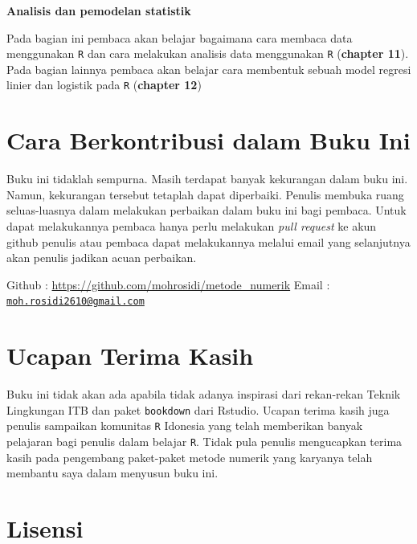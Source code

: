 \documentclass[
]{book}
\theoremstyle{definition}
\theoremstyle{definition}
\theoremstyle{definition}
\theoremstyle{definition}
\theoremstyle{remark}
\begin{document}
\textbf{Analisis dan pemodelan statistik}

Pada bagian ini pembaca akan belajar bagaimana cara membaca data menggunakan \texttt{R} dan cara melakukan analisis data menggunakan \texttt{R} (\textbf{chapter 11}). Pada bagian lainnya pembaca akan belajar cara membentuk sebuah model regresi linier dan logistik pada \texttt{R} (\textbf{chapter 12})

\hypertarget{cara-berkontribusi-dalam-buku-ini}{%
\section*{Cara Berkontribusi dalam Buku Ini}\label{cara-berkontribusi-dalam-buku-ini}}

Buku ini tidaklah sempurna. Masih terdapat banyak kekurangan dalam buku ini. Namun, kekurangan tersebut tetaplah dapat diperbaiki. Penulis membuka ruang seluas-luasnya dalam melakukan perbaikan dalam buku ini bagi pembaca. Untuk dapat melakukannya pembaca hanya perlu melakukan \emph{pull request} ke akun github penulis atau pembaca dapat melakukannya melalui email yang selanjutnya akan penulis jadikan acuan perbaikan.

Github : \url{https://github.com/mohrosidi/metode_numerik}
Email : \href{mailto:moh.rosidi2610@gmail.com}{\nolinkurl{moh.rosidi2610@gmail.com}}

\hypertarget{ucapan-terima-kasih}{%
\section*{Ucapan Terima Kasih}\label{ucapan-terima-kasih}}

Buku ini tidak akan ada apabila tidak adanya inspirasi dari rekan-rekan Teknik Lingkungan ITB dan paket \texttt{bookdown} dari Rstudio. Ucapan terima kasih juga penulis sampaikan komunitas \texttt{R} Idonesia yang telah memberikan banyak pelajaran bagi penulis dalam belajar \texttt{R}. Tidak pula penulis mengucapkan terima kasih pada pengembang paket-paket metode numerik yang karyanya telah membantu saya dalam menyusun buku ini.

\hypertarget{lisensi}{%
\section*{Lisensi}\label{lisensi}}
\end{document}
